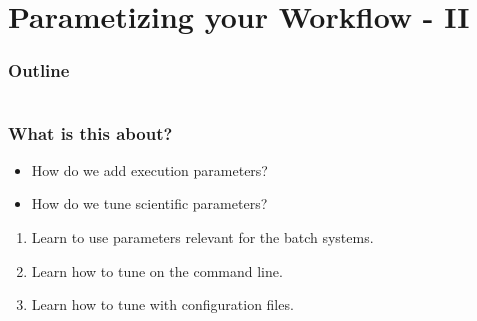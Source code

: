\section{Parametizing your Workflow - II}

\begin{frame}
    \frametitle{Outline}
    \begin{columns}[t]
        \begin{column}{.5\textwidth}
            \tableofcontents[sections={1-7},currentsection]
        \end{column}
        \begin{column}{.5\textwidth}
            \tableofcontents[sections={8-15},currentsection]
        \end{column}
    \end{columns}
\end{frame}

\begin{frame}
  \frametitle{What is this about?}
  \begin{question}[Questions]
   	\begin{itemize}
      \item How do we add execution parameters?
      \item How do we tune scientific parameters?
    \end{itemize}
  \end{question}
   \begin{docs}[Objectives]
   	 \begin{enumerate} 
        \item Learn to use parameters relevant for the batch systems.
        \item Learn how to tune \Snakemake{} on the command line.
        \item Learn how to tune \Snakemake{} with configuration files.
    \end{enumerate}
  \end{docs}
\end{frame}
